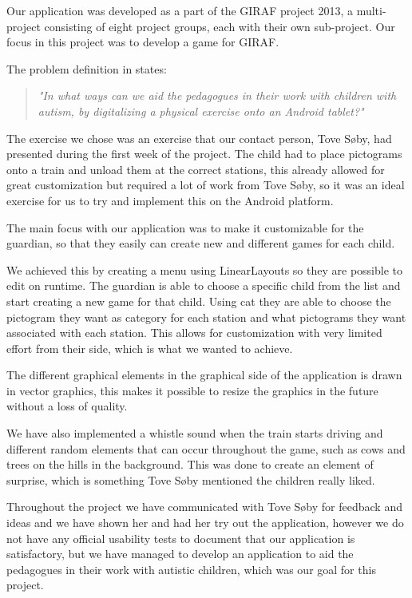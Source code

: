 Our application was developed as a part of the GIRAF project 2013, a multi-project consisting of eight project groups, each with their own sub-project. Our focus in this project was to develop a game for GIRAF. 

The problem definition in  states:

\begin{quote}
\textit{"In what ways can we aid the pedagogues in their work with children with autism, by digitalizing a physical exercise onto an Android tablet?"} 
\end{quote}
The exercise we chose was an exercise that our contact person, Tove Søby, had presented during the first week of the project. The child had to place pictograms onto a train and unload them at the correct stations, this already allowed for great customization but required a lot of work from Tove Søby, so it was an ideal exercise for us to try and implement this on the Android platform. 

The main focus with our application was to make it customizable for the guardian, so that they easily can create new and different games for each child. 

We achieved this by creating a menu using LinearLayouts so they are possible to edit on runtime. The guardian is able to choose a specific child from the list and start creating a new game for that child. Using \ac{cat} they are able to choose the pictogram they want as category for each station and what pictograms they want associated with each station. This allows for customization with very limited effort from their side, which is what we wanted to achieve. 

The different graphical elements in the graphical side of the application is drawn in vector graphics, this makes it possible to resize the graphics in the future without a loss of quality. 

We have also implemented a whistle sound when the train starts driving and different random elements that can occur throughout the game, such as cows and trees on the hills in the background. This was done to create an element of surprise, which is something Tove Søby mentioned the children really liked. 

Throughout the project we have communicated with Tove Søby for feedback and ideas and we have shown her and had her try out the application, however we do not have any official usability tests to document that our application is satisfactory, but we have managed to develop an application to aid the pedagogues in their work with autistic children, which was our goal for this project. 
